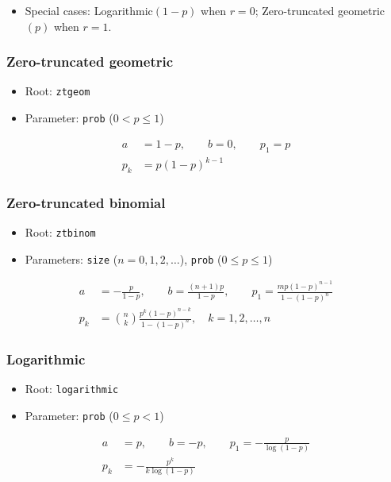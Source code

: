 \documentclass[x11names]{article}
\newcommand{\code}[1]{\texttt{#1}}
\begin{document}
\begin{itemize}
\item Special cases:  Logarithmic$(1 - p)$ when $r = 0$;
  Zero-truncated geometric$(p)$ when $r = 1$.
\end{itemize}

\subsubsection{Zero-truncated geometric}

\begin{itemize}
\item Root: \code{ztgeom}
\item Parameter: \code{prob} ($0 < p \leq 1$)
\end{itemize}
\begin{align*}
  a &= 1 - p, \qquad b = 0, \qquad p_1 = p \\
  p_k &= p (1 - p)^{k - 1}
\end{align*}

\subsubsection{Zero-truncated binomial}

\begin{itemize}
\item Root: \code{ztbinom}
\item Parameters: \code{size} ($n = 0, 1, 2, \dots$),
  \code{prob} ($0 \leq p \leq 1$)
\end{itemize}
\begin{align*}
  a &= -\frac{p}{1 - p}, \qquad b = \frac{(n + 1)p}{1 - p}, \qquad
      p_1 = \frac{m p (1 - p)^{n - 1}}{1 - (1 - p)^n} \\
  p_k &= \binom{n}{k} \frac{p^k (1 - p)^{n - k}}{1 - (1 - p)^n}, \quad
        k = 1, 2, \dots, n
\end{align*}

\subsubsection{Logarithmic}

\begin{itemize}
\item Root: \code{logarithmic}
\item Parameter: \code{prob} ($0 \leq p < 1$)
\end{itemize}
\begin{align*}
  a &= p, \qquad b = -p, \qquad
      p_1 = - \frac{p}{\log (1 - p)} \\
  p_k &= - \frac{p^k}{k \log (1 - p)}
\end{align*}
\end{document}
